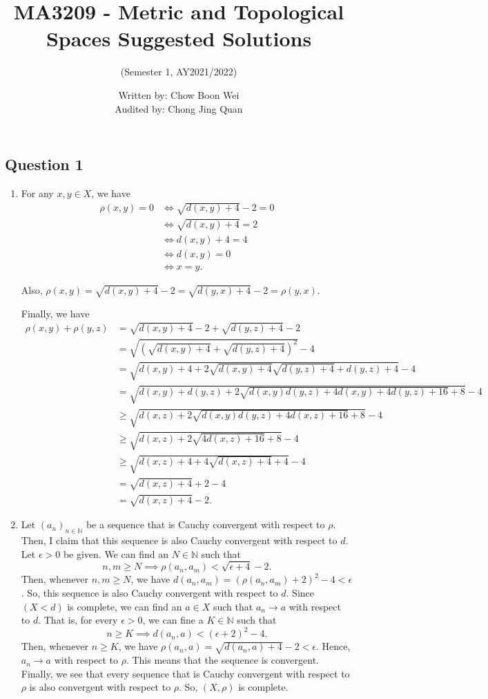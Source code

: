 \documentclass{article}
\title{MA3209 - Metric and Topological Spaces Suggested Solutions}
\author{(Semester 1, AY2021/2022)}
\date{Written by: Chow Boon Wei\\Audited by: Chong Jing Quan}
\newcommand{\N}{\mathbb{N}}
\begin{document}
\maketitle
\subsection*{Question 1}

\begin{enumerate}[label=\roman*)]

\item For any $x,y\in X$, we have 
\begin{align*}
    \rho(x,y) = 0 &\iff \sqrt{d(x,y)+4}-2=0\\
    &\iff \sqrt{d(x,y)+4}=2\\
    &\iff d(x,y)+4=4\\
    &\iff d(x,y)=0\\
    &\iff x=y.
\end{align*}

Also, $\rho(x,y) = \sqrt{d(x,y)+4}-2 = \sqrt{d(y,x)+4}-2 = \rho(y,x)$. 

Finally, we have 
\begin{align*}
    \rho(x,y)+\rho(y,z) &= \sqrt{d(x,y)+4}-2+\sqrt{d(y,z)+4}-2\\
    &= \sqrt{(\sqrt{d(x,y)+4}+\sqrt{d(y,z)+4})^2}-4\\
    &= \sqrt{d(x,y)+4+2\sqrt{d(x,y)+4}\sqrt{d(y,z)+4}+d(y,z)+4}-4\\
    &= \sqrt{d(x,y)+d(y,z)+2\sqrt{d(x,y)d(y,z)+4d(x,y)+4d(y,z)+16}+8}-4\\
    &\geq \sqrt{d(x,z)+2\sqrt{d(x,y)d(y,z)+4d(x,z)+16}+8}-4\\
    &\geq \sqrt{d(x,z)+2\sqrt{4d(x,z)+16}+8}-4\\
    &\geq \sqrt{d(x,z)+4+4\sqrt{d(x,z)+4}+4}-4\\
    &= \sqrt{d(x,z)+4}+2-4\\
    &= \sqrt{d(x,z)+4}-2.
\end{align*}

\item Let $(a_n)_{n\in\N}$ be a sequence that is Cauchy convergent with respect to $\rho$. 
Then, I claim that this sequence is also Cauchy convergent with respect to $d$. 
Let $\epsilon>0$ be given. We can find an $N\in \N$ such that 
$$
n,m\geq N \implies \rho(a_n,a_m) < \sqrt{\epsilon+4}-2. 
$$
Then, whenever $n,m\geq N$, we have $d(a_n,a_m) = (\rho(a_n,a_m) + 2)^2-4 < \epsilon$. 
So, this sequence is also Cauchy convergent with respect to $d$. 
Since $(X<d)$ is complete, we can find an $a\in X$ such that $a_n\to a$ with respect to $d$. 
That is, for every $\epsilon>0$, we can fine a $K\in \N$ such that 
$$
n\geq K \implies d(a_n,a)<(\epsilon+2)^2-4.
$$
Then, whenever $n\geq K$, we have 
$\rho(a_n,a) = \sqrt{d(a_n,a)+4}-2 < \epsilon$. Hence, $a_n \to a$ with respect to $\rho$. 
This means that the sequence is convergent.
Finally, we see that every sequence that is Cauchy convergent with respect to $\rho$ is also 
convergent with respect to $\rho$. So, $(X,\rho)$ is complete. 


\end{enumerate}
\end{document}

